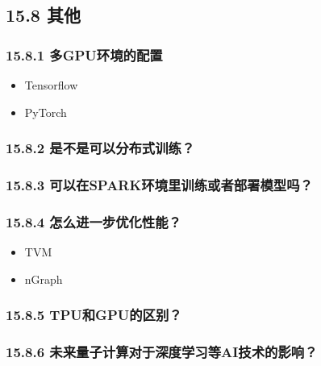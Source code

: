 \subsection{15.8 其他}\label{ux5176ux4ed6}

\subsubsection{15.8.1
多GPU环境的配置}\label{ux591agpuux73afux5883ux7684ux914dux7f6e}

\begin{itemize}
\item
  Tensorflow
\item
  PyTorch
\end{itemize}

\subsubsection{15.8.2
是不是可以分布式训练？}\label{ux662fux4e0dux662fux53efux4ee5ux5206ux5e03ux5f0fux8badux7ec3}

\subsubsection{15.8.3
可以在SPARK环境里训练或者部署模型吗？}\label{ux53efux4ee5ux5728sparkux73afux5883ux91ccux8badux7ec3ux6216ux8005ux90e8ux7f72ux6a21ux578bux5417}

\subsubsection{15.8.4
怎么进一步优化性能？}\label{ux600eux4e48ux8fdbux4e00ux6b65ux4f18ux5316ux6027ux80fd}

\begin{itemize}
\item
  TVM
\item
  nGraph
\end{itemize}

\subsubsection{15.8.5
TPU和GPU的区别？}\label{tpuux548cgpuux7684ux533aux522b}

\subsubsection{15.8.6
未来量子计算对于深度学习等AI技术的影响？}\label{ux672aux6765ux91cfux5b50ux8ba1ux7b97ux5bf9ux4e8eux6df1ux5ea6ux5b66ux4e60ux7b49aiux6280ux672fux7684ux5f71ux54cd}


